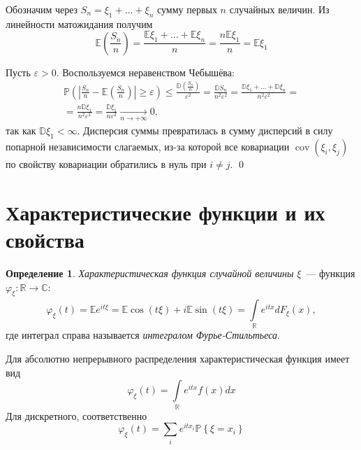 \documentclass[oneside,final,14pt]{extreport}
\renewenvironment{proof}{{\bfseries Доказательство.}}{\qed}
\theoremstyle{plain}
\theoremstyle{definition}
\newtheorem*{defn}{Определение}
\theoremstyle{named}
\begin{document}
\begin{proof}
    Обозначим через $S_n = \xi_1 + \ldots + \xi_n$ сумму первых $n$ случайных величин. Из линейности матожидания получим
    \begin{equation*}
        \mathbb{E}\left(\frac{S_{n}}{n}\right)=\frac{\mathbb{E} \xi_{1}+\ldots+\mathbb{E} \xi_{n}}{n}=\frac{n \mathbb{E} \xi_{1}}{n}=\mathbb{E} \xi_{1}
    \end{equation*}
    
    Пусть $\varepsilon > 0.$ Воспользуемся неравенством Чебышёва:
    \begin{multline*}
        \mathbb{P}\left(\left|\frac{S_{n}}{n}-\mathbb{E}\left(\frac{S_{n}}{n}\right)\right| \geqslant \varepsilon\right) \leqslant \frac{\mathbb{D}\left(\frac{S_{n}}{n}\right)}{\varepsilon^{2}}
        = \frac{\mathbb{D} S_{n}}{n^{2} \varepsilon^{2}}
        = \frac{\mathbb{D} \xi_{1}+\ldots+\mathbb{D} \xi_{n}}{n^{2} \varepsilon^{2}}= \\
        = \frac{n \mathbb{D} \xi_{1}}{n^{2} \varepsilon^{2}}
        = \frac{\mathbb{D} \xi_{1}}{n \varepsilon^{2}} \xrightarrow[n \to +\infty]{} 0,
    \end{multline*}
    так как $\mathbb{D}\xi_1 < \infty$. Дисперсия суммы превратилась в сумму дисперсий в силу попарной независимости слагаемых, из-за которой все ковариации $\operatorname{cov}(\xi_i, \xi_j)$ по свойству ковариации обратились в нуль при $i \neq j$.
\end{proof}

\section{Характеристические функции и их свойства}
\begin{defn}
    {\it Характеристическая функция случайной величины} $\xi$~--- функция $\varphi_{\xi}: \mathbb{R} \rightarrow \mathbb{C}$:
    \begin{equation*}
        \varphi_{\xi}(t)
        = \mathbb{E} e^{it \xi}
        = \mathbb{E} \cos (t \xi)+i \mathbb{E} \sin (t \xi) = \int\limits_{\mathbb{R}}^{} e^{i t x} d F_{\xi}(x),
    \end{equation*}
    где интеграл справа называется {\it интегралом Фурье-Стильтьеса}.
    
    Для абсолютно непрерывного распределения характеристическая функция имеет вид
    \begin{equation*}
        \varphi_{\xi}(t)=\int\limits_{\mathbb{R}} e^{i t x} f(x) d x
    \end{equation*}
    Для дискретного, соответственно
    \begin{equation*}
        \varphi_{\xi}(t)=\sum\limits_{i} e^{i t x_{i}} \mathbb{P}\left\{\xi=x_{i}\right\}
    \end{equation*}
\end{defn}
\end{document}
